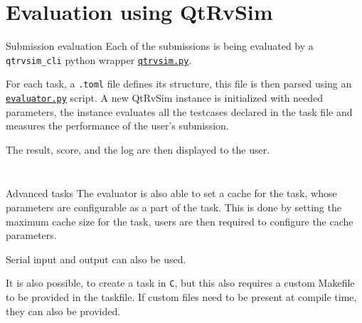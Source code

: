 \documentclass{beamer}
\begin{document}
		\section{Evaluation using QtRvSim}

		\begin{frame}{Submission evaluation}
			Each of the submissions is being evaluated by a \texttt{qtrvsim\_cli} python 
			wrapper \href{https://gitlab.fel.cvut.cz/b35apo/qtrvsim-eval-web/-/blob/main/evaluator/qtrvsim.py}{\texttt{qtrvsim.py}}. \par
	
			For each task, a \texttt{.toml} file defines its structure, this file is then parsed using an \href{https://gitlab.fel.cvut.cz/b35apo/qtrvsim-eval-web/-/blob/main/evaluator/evaluator.py}{\texttt{evaluator.py}} script. A new QtRvSim instance is initialized with needed parameters,
			the instance evaluates all the testcases declared in the task file and measures the performance of the user's submission. \par
	
			The result, score, and the log are then displayed to the user.
		\end{frame}
	
		\begin{frame}[fragile]
			\tiny
			\inputminted{python}{examples/5/evaluate.py}
		\end{frame}

		\begin{frame}[fragile]
			\tiny
			\inputminted{toml}{examples/5/task.toml}
		\end{frame}

		\begin{frame}{Advanced tasks}
			The evaluator is also able to set a cache for the task, whose parameters are configurable as a part of the task. This is done by setting the maximum cache size for the task, users are then required to configure the cache parameters. \par

			Serial input and output can also be used. \par

			It is also possible, to create a task in \texttt{C}, but this also requires a custom Makefile to be provided in the taskfile. If custom files need to be present at compile time, they can also be provided. \par
		\end{frame}

		\begin{frame}[fragile]
			\small
			\inputminted{toml}{examples/5/cache.toml}
		\end{frame}
\end{document}
